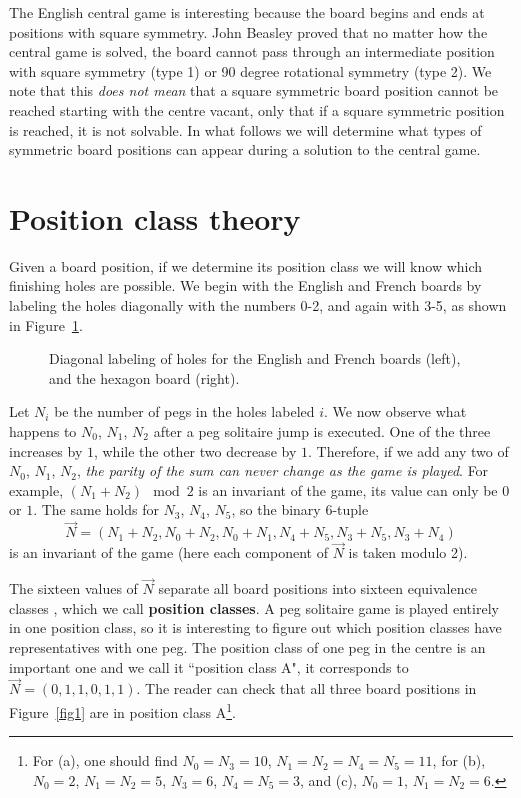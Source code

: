 \documentclass[12pt,reqno]{article}
\begin{document}
The English central game is interesting because the board begins and ends
at positions with square symmetry.
John Beasley proved \cite{Beasley} that no matter how the central game is solved, 
the board cannot pass through an intermediate position with square symmetry (type 1)
or 90 degree rotational symmetry (type 2).
We note that this {\it does not mean} that a square symmetric board position
cannot be reached starting with the centre vacant,
only that if a square symmetric position is reached,
it is not solvable.
In what follows we will determine what types of symmetric board positions can appear
during a solution to the central game.

\section{Position class theory}
\label{sec:positionclass}

Given a board position, if we determine its position class we will know which finishing holes are possible.
We begin with the English and French boards by labeling the holes diagonally with the numbers 0-2,
and again with 3-5, as shown in Figure~\ref{fig4}.

\begin{figure}[htb]
\centering
{}
\caption{Diagonal labeling of holes for the English and French boards (left), and the hexagon board (right).}
\label{fig4}
\end{figure}

Let $N_i$ be the number of pegs in the holes labeled $i$.
We now observe what happens to $N_0$, $N_1$, $N_2$ after a peg solitaire jump is executed.
One of the three increases by $1$, while the other two decrease by $1$.
Therefore, if we add any two of $N_0$, $N_1$, $N_2$, {\it the parity of the sum can never change as the game is played}.
For example, $(N_1+N_2)\mod 2$ is an invariant of the game, its value can only be $0$ or $1$.
The same holds for $N_3$, $N_4$, $N_5$, so the binary 6-tuple
\begin{equation}
\vec{N} = (N_1+N_2, N_0+N_2, N_0+N_1, N_4+N_5, N_3+N_5, N_3+N_4)
\end{equation}
is an invariant of the game (here each component of $\vec{N}$ is taken modulo 2).

The sixteen values of $\vec{N}$ separate all board positions into sixteen equivalence classes \cite{Beasley},
which we call {\bf position classes}.
A peg solitaire game is played entirely in one position class,
so it is interesting to figure out which position classes have representatives with one peg.
The position class of one peg in the centre is an important one and we call it
``position class A", it corresponds to $\vec{N}=(0,1,1,0,1,1)$.
The reader can check that all three board positions in Figure~\ref{fig1} are in position
class A\footnote{For (a), one should find $N_0=N_3=10$, $N_1=N_2=N_4=N_5=11$,
for (b), $N_0=2$, $N_1=N_2=5$, $N_3=6$, $N_4=N_5=3$, and (c), $N_0=1$, $N_1=N_2=6$.}.
\end{document}
